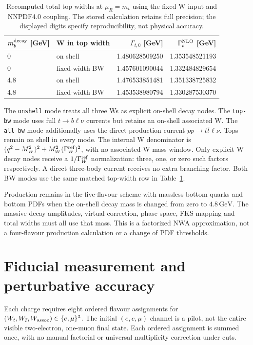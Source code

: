 \documentclass[11pt,a4paper]{article}
\newcommand{\GeV}{\,\mathrm{GeV}}
\begin{document}
\begin{table}[t]
\centering
\begin{tabular}{llrr}
\toprule
$m_b^{\rm decay}$ [GeV] & W in top width &
$\Gamma_{t,0}$ [GeV] & $\Gamma_t^{\rm NLO}$ [GeV]\\
\midrule
0 & on shell & 1.480628509250 & 1.353548521193\\
0 & fixed-width BW & 1.457601090044 & 1.332484829654\\
4.8 & on shell & 1.476533851481 & 1.351338725832\\
4.8 & fixed-width BW & 1.453538980794 & 1.330287530370\\
\bottomrule
\end{tabular}
\caption{Recomputed total top widths at $\mu_R=m_t$ using the fixed W
input and NNPDF4.0 coupling. The stored calculation retains full precision;
the displayed digits specify reproducibility, not physical accuracy.}
\label{tab:widths}
\end{table}

The \texttt{onshell} mode treats all three Ws as explicit on-shell decay
nodes. The \texttt{top-bw} mode uses full $t\to b\ell\nu$ currents but
retains an on-shell associated W. The \texttt{all-bw} mode additionally
uses the direct production current $pp\to t\bar t\ell\nu$. Tops remain
on shell in every mode. The internal W denominator is
$(q^2-M_W^2)^2+M_W^2(\Gamma_W^{\rm ref})^2$, with no associated-W mass
window. Only explicit W decay nodes receive a $1/\Gamma_W^{\rm ref}$
normalization: three, one, or zero such factors respectively. A direct
three-body current receives no extra branching factor. Both BW modes use
the same matched top-width row in Table~\ref{tab:widths}.

Production remains in the five-flavour scheme with massless bottom quarks
and bottom PDFs when the on-shell decay mass is changed from zero to
$4.8\GeV$. The massive decay amplitudes, virtual correction, phase space,
FKS mapping and total widths must all use that mass. This is a factorized
NWA approximation, not a four-flavour production calculation or a change
of PDF thresholds.

\section{Fiducial measurement and perturbative accuracy}

Each charge requires eight ordered flavour assignments for
$(W_t,W_{\bar t},W_{\rm assoc})\in\{e,\mu\}^3$. The initial
$(e,e,\mu)$ channel is a pilot, not the entire visible two-electron,
one-muon final state. Each ordered assignment is summed once, with no
manual factorial or universal multiplicity correction under cuts.
\end{document}
